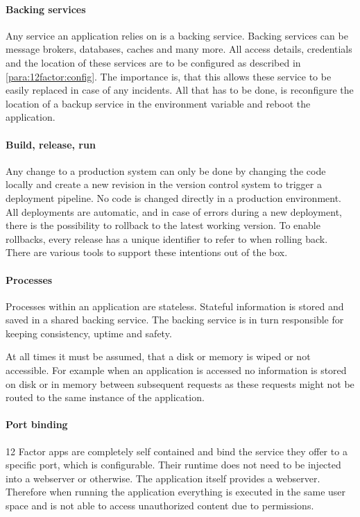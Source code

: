 \paragraph{Backing services}

Any service an application relies on is a backing service. Backing services can
be message brokers, databases, caches and many more. All access details,
credentials and the location of these services are to be configured as
described in \ref{para:12factor:config}. The importance is, that this allows
these service to be easily replaced in case of any incidents. All that has to
be done, is reconfigure the location of a backup service in the environment
variable and reboot the application.

\paragraph{Build, release, run}

Any change to a production system can only be done by changing the code locally
and create a new revision in the version control system to trigger a deployment
pipeline. No code is changed directly in a production environment. All
deployments are automatic, and in case of errors during a new deployment, there
is the possibility to rollback to the latest working version. To enable
rollbacks, every release has a unique identifier to refer to when rolling back.
There are various tools to support these intentions out of the box.

\paragraph{Processes}

Processes within an application are stateless. Stateful information is stored
and saved in a shared backing service. The backing service is in turn
responsible for keeping consistency, uptime and safety.

At all times it must be assumed, that a disk or memory is wiped or not
accessible. For example when an application is accessed no information is
stored on disk or in memory between subsequent requests as these requests might
not be routed to the same instance of the application.

\paragraph{Port binding}

12 Factor apps are completely self contained and bind the service they offer to
a specific port, which is configurable. Their runtime does not need to be
injected into a webserver or otherwise. The application itself provides a
webserver.  Therefore when running the application everything is executed in
the same user space and is not able to access unauthorized content due to
permissions.

